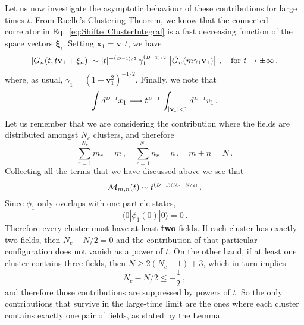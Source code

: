 Let us now investigate the asymptotic behaviour
of these contributions for large times $t$. From Ruelle's Clustering Theorem, we
know that the connected correlator in Eq.~\eqref{eq:ShiftedClusterIntegral} is a
fast decreasing function of the space vectors $\mathbf{\xi}_i$. Setting
$\mathbf{x}_1=\mathbf{v}_1 t$, we have
\begin{equation}
    \label{eq:AsymptoticBehaviourGn}
    \left|G_n(t,t\mathbf{v}_1+\mathbf{\xi}_n)\right| \sim
    |t|^{-(\scriptscriptstyle{D-1})/2}\, \gamma_1^{(\scriptscriptstyle{D-1})/2} \, 
    \left|\tilde{G}_n(m\gamma_1 \mathbf{v}_1)\right|\, , \quad \mathrm{for}\ t\to\pm\infty\, .
\end{equation}
where, as usual, $\gamma_1=(1-\mathbf{v}_1^2)^{-1/2}$. Finally, we note that 
\begin{equation}
    \int d^{\scriptscriptstyle{D-1}}x_1 \longrightarrow 
    t^{\scriptscriptstyle{D-1}}\, \int_{|\mathbf{v}_1|<1} d^{\scriptscriptstyle{D-1}}v_1 \,.
\end{equation}
Let us remember that we are considering the contribution where the fields are
distributed amongst $N_c$ clusters, and therefore
\begin{equation}
    \label{eq:CountingFieldsInClusters}
    \sum_{r=1}^{N_c} m_r = m\, , \quad 
    \sum_{r=1}^{N_c} n_r = n\, , \quad 
    m+n = N\, .
\end{equation}
Collecting all the terms that we have discussed above we see that
\begin{equation}
    \label{eq:ClusterAsymptTotal}
    \mathcal{M}_{m,n}(t) \sim t^{(\scriptscriptstyle{D-1}) \left(N_c - N/2\right)}\, .
\end{equation}
Since $\phi_{1}$ only overlaps with one-particle states, 
\begin{equation}
    \label{eq:OneParticlePhase}
    \langle 0 | \phi_{1}(0) | 0 \rangle = 0\, .
\end{equation}
Therefore every cluster must have at least {\bf two} fields. If each cluster has
exactly two fields, then $N_c-N/2=0$ and the contribution of that particular
configuration does not vanish as a power of $t$. On the other hand, if at least
one cluster contains three fields, then $N \geq 2(N_c-1) + 3$, which in turn
implies
\begin{equation}
    \label{eq:ThreeFieldClusterSuppression}
    N_c - N/2 \leq -\frac12\, ,
\end{equation}
and therefore those contributions are suppressed by powers of $t$. So the only
contributions that survive in the large-time limit are the ones where each
cluster contains exactly one pair of fields, as stated by the Lemma. 

